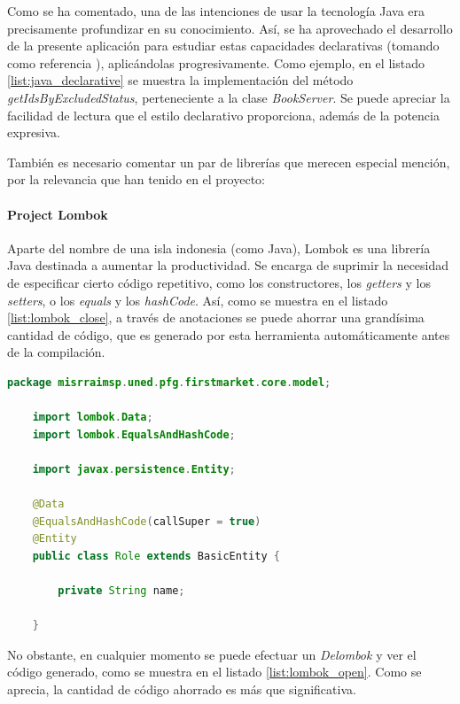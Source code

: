 \documentclass[a4paper,12pt,twoside,openright]{report}
\begin{document}
    Como se ha comentado, una de las intenciones de usar la tecnología Java era precisamente profundizar en su conocimiento. Así, se ha aprovechado el desarrollo de la presente aplicación para estudiar estas capacidades declarativas (tomando como referencia \cite{QuentinCharatan2019}), aplicándolas progresivamente. Como ejemplo, en el listado \ref{list:java_declarative} se muestra la implementación del método \emph{getIdsByExcludedStatus}, perteneciente a la clase \emph{BookServer}. Se puede apreciar la facilidad de lectura que el estilo declarativo proporciona, además de la potencia expresiva. 
    
    También es necesario comentar un par de librerías que merecen especial mención, por la relevancia que han tenido en el proyecto:
    
    \paragraph{Project Lombok}
    Aparte del nombre de una isla indonesia (como Java), Lombok es una librería Java destinada a aumentar la productividad. Se encarga de suprimir la necesidad de especificar cierto código repetitivo, como los constructores, los \emph{getters} y los \emph{setters}, o los \emph{equals} y los \emph{hashCode}. Así, como se muestra en el listado \ref{list:lombok_close}, a través de anotaciones se puede ahorrar una grandísima cantidad de código, que es generado por esta herramienta automáticamente antes de la compilación.
    \\
    
    \begin{lstlisting}[language=Java,caption=Clase \emph{Role} usando las anotaciones Lombok,label=list:lombok_close]
    package misrraimsp.uned.pfg.firstmarket.core.model;
    
    import lombok.Data;
    import lombok.EqualsAndHashCode;
    
    import javax.persistence.Entity;
    
    @Data
    @EqualsAndHashCode(callSuper = true)
    @Entity
    public class Role extends BasicEntity {
    
    	private String name;
    
    }
    \end{lstlisting}
    
    No obstante, en cualquier momento se puede efectuar un \emph{Delombok} y ver el código generado, como se muestra en el listado \ref{list:lombok_open}. Como se aprecia, la cantidad de código ahorrado es más que significativa.
    \\
    
\end{document}
